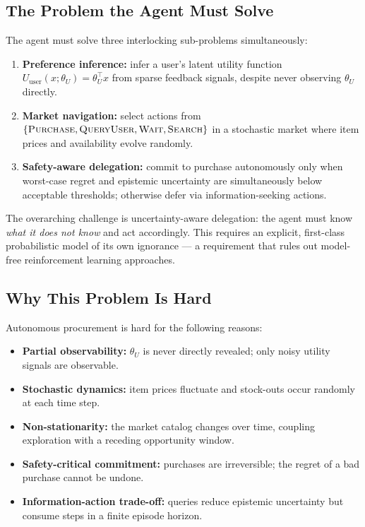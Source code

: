 \documentclass[11pt,letterpaper]{article}
\newcommand{\Purchase}{\textsc{Purchase}}
\newcommand{\QueryUser}{\textsc{QueryUser}}
\newcommand{\Wait}{\textsc{Wait}}
\newcommand{\Search}{\textsc{Search}}
\newcommand{\thetaU}{\theta_U}
\begin{document}
\subsection{The Problem the Agent Must Solve}

The agent must solve three interlocking sub-problems simultaneously:
\begin{enumerate}[nosep]
    \item \textbf{Preference inference:} infer a user's latent utility function $U_{\mathrm{user}}(x;\thetaU) = \thetaU^\top x$ from sparse feedback signals, despite never observing $\thetaU$ directly.
    \item \textbf{Market navigation:} select actions from $\{\Purchase, \QueryUser, \Wait, \Search\}$ in a stochastic market where item prices and availability evolve randomly.
    \item \textbf{Safety-aware delegation:} commit to purchase autonomously only when worst-case regret and epistemic uncertainty are simultaneously below acceptable thresholds; otherwise defer via information-seeking actions.
\end{enumerate}

The overarching challenge is uncertainty-aware delegation: the agent must know \emph{what it does not know} and act accordingly.  This requires an explicit, first-class probabilistic model of its own ignorance --- a requirement that rules out model-free reinforcement learning approaches.

\subsection{Why This Problem Is Hard}

Autonomous procurement is hard for the following reasons:
\begin{itemize}[nosep]
    \item \textbf{Partial observability:} $\thetaU$ is never directly revealed; only noisy utility signals are observable.
    \item \textbf{Stochastic dynamics:} item prices fluctuate and stock-outs occur randomly at each time step.
    \item \textbf{Non-stationarity:} the market catalog changes over time, coupling exploration with a receding opportunity window.
    \item \textbf{Safety-critical commitment:} purchases are irreversible; the regret of a bad purchase cannot be undone.
    \item \textbf{Information-action trade-off:} queries reduce epistemic uncertainty but consume steps in a finite episode horizon.
\end{itemize}
\end{document}
